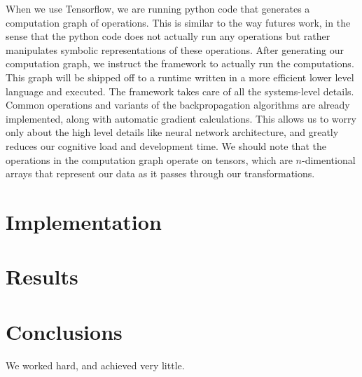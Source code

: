 \documentclass[12pt]{article}
\begin{document}
When we use Tensorflow, we are running python code that generates a computation
graph of operations. This is similar to the way futures work, in the sense
that the python code does not actually run any operations but rather
manipulates symbolic representations of these operations. After generating
our computation graph, we instruct the framework to actually run the computations.
This graph will be shipped off to a runtime written in a more efficient lower level
language and executed. The framework takes care of all the systems-level details.
Common operations and variants of the backpropagation algorithms are already implemented,
along with automatic gradient calculations. This allows us to worry only about the
high level details like neural network architecture, and greatly reduces our cognitive
load and development time. We should note that the operations in the computation graph
operate on tensors, which are $n$-dimentional arrays that represent our data as
it passes through our transformations.

\section{Implementation}\label{implementation}


\section{Results}\label{results}

\section{Conclusions}\label{conclusions}
We worked hard, and achieved very little.



\end{document}
